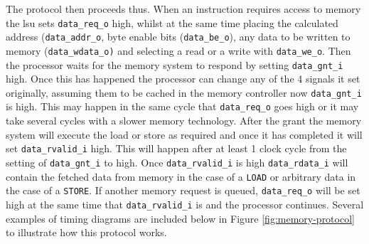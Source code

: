The protocol then proceeds thus. When an instruction requires access to memory the \gls{lsu} sets \texttt{data\_req\_o} high, whilst at the same time placing the calculated address (\texttt{data\_addr\_o}, byte enable bits (\texttt{data\_be\_o}), any data to be written to memory (\texttt{data\_wdata\_o)} and selecting a read or a write with \texttt{data\_we\_o}. Then the processor waits for the memory system to respond by setting \texttt{data\_gnt\_i} high. Once this has happened the processor can change any of the 4 signals it set originally, assuming them to be cached in the memory controller now \texttt{data\_gnt\_i} is high. This may happen in the same cycle that \texttt{data\_req\_o} goes high or it may take several cycles with a slower memory technology. After the grant the memory system will execute the load or store as required and once it has completed it will set \texttt{data\_rvalid\_i} high. This will happen after at least 1 clock cycle from the setting of \texttt{data\_gnt\_i} to high. Once \texttt{data\_rvalid\_i} is high \texttt{data\_rdata\_i} will contain the fetched data from memory in the case of a \texttt{LOAD} or arbitrary data in the case of a \texttt{STORE}. If another memory request is queued, \texttt{data\_req\_o} will be set high at the same time that \texttt{data\_rvalid\_i} is and the processor continues. Several examples of timing diagrams are included below in Figure \ref{fig:memory-protocol} to illustrate how this protocol works.
	
